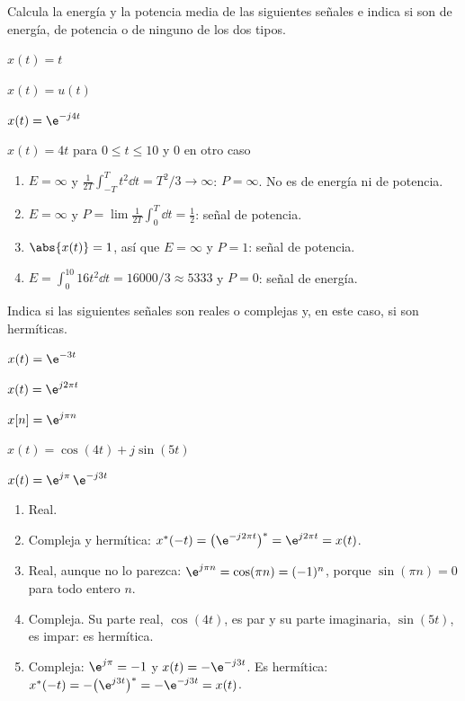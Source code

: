 \documentclass[11pt,a4paper]{scrartcl}
\begin{document}
\begin{ejercicio}
  Calcula la energía y la potencia media de las siguientes señales e indica si son de energía, de potencia o de ninguno de los dos tipos.
  \begin{incisos}[2]
    \item $x(t)=t$
    \item $x(t)=u(t)$
    \item $x(t)=\e^{-j4t}$
    \item $x(t)=4t$ para $0\le t\le10$ y $0$ en otro caso
  \end{incisos}
\end{ejercicio}
\begin{solucion}
  \begin{enumerate}[label=\alph*)]
    \item $E=\infty$ y $\frac{1}{2T}\int_{-T}^{T}t^2\dd t=T^2/3\to\infty$: $P=\infty$. No es de energía ni de potencia.
    \item $E=\infty$ y $P=\lim\frac{1}{2T}\int_0^T\dd t=\tfrac12$: señal de potencia.
    \item $\abs{x(t)}=1$, así que $E=\infty$ y $P=1$: señal de potencia.
    \item $E=\int_0^{10}16t^2\dd t=16000/3\approx5333$ y $P=0$: señal de energía.
  \end{enumerate}
\end{solucion}

\begin{ejercicio}
  Indica si las siguientes señales son reales o complejas y, en este caso, si son hermíticas.
  \begin{incisos}[3]
    \item $x(t)=\e^{-3t}$
    \item $x(t)=\e^{j2\pi t}$
    \item $x[n]=\e^{j\pi n}$
    \item $x(t)=\cos(4t)+j\sin(5t)$
    \item $x(t)=\e^{j\pi}\,\e^{-j3t}$
  \end{incisos}
\end{ejercicio}
\begin{solucion}
  \begin{enumerate}[label=\alph*)]
    \item Real.
    \item Compleja y hermítica: $x^*(-t)=\big(\e^{-j2\pi t}\big)^*=\e^{j2\pi t}=x(t)$.
    \item Real, aunque no lo parezca: $\e^{j\pi n}=\cos(\pi n)=(-1)^n$, porque $\sin(\pi n)=0$ para todo entero $n$.
    \item Compleja. Su parte real, $\cos(4t)$, es par y su parte imaginaria, $\sin(5t)$, es impar: es hermítica.
    \item Compleja: $\e^{j\pi}=-1$ y $x(t)=-\e^{-j3t}$. Es hermítica: $x^*(-t)=-\big(\e^{j3t}\big)^*=-\e^{-j3t}=x(t)$.
  \end{enumerate}
\end{solucion}
\end{document}

